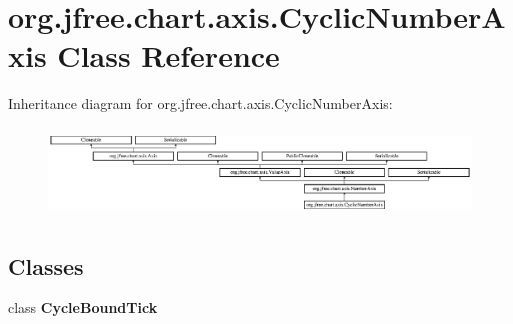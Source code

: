 \hypertarget{classorg_1_1jfree_1_1chart_1_1axis_1_1_cyclic_number_axis}{}\section{org.\+jfree.\+chart.\+axis.\+Cyclic\+Number\+Axis Class Reference}
\label{classorg_1_1jfree_1_1chart_1_1axis_1_1_cyclic_number_axis}
Inheritance diagram for org.\+jfree.\+chart.\+axis.\+Cyclic\+Number\+Axis\+:\begin{figure}[H]
\begin{center}
\leavevmode
\includegraphics[height=2.372881cm]{classorg_1_1jfree_1_1chart_1_1axis_1_1_cyclic_number_axis}
\end{center}
\end{figure}
\subsection*{Classes}
\begin{DoxyCompactItemize}
\item 
class {\bfseries Cycle\+Bound\+Tick}
\end{DoxyCompactItemize}
